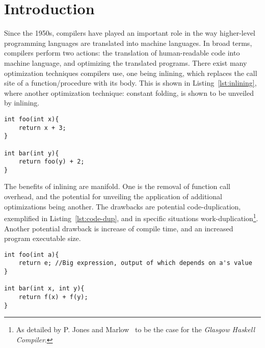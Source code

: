 
\section{Introduction}
\label{introduction}

Since the 1950s, compilers have played an important role in the way higher-level
programming languages are translated into machine languages. In broad terms,
compilers perform two actions: the translation of human-readable code into
machine language, and optimizing the translated programs. There exist many
optimization techniques compilers use, one being inlining, which replaces the
call site of a function/procedure with its body. This is shown in
Listing~\ref{lst:inlining}, where another optimization technique: constant
folding, is shown to be unveiled by inlining.

\begin{lstlisting}[label={lst:inlining}, style=customcpp,
caption={Function \lstinline!foo()! inlined into function \lstinline!bar()!
would result in the body of \lstinline!bar()! being \lstinline!return x + 3 +
2!, in which case constant folding can be used, replacing the \textit{return}
expression of \lstinline!bar()! with: \lstinline!x + 5!.}]
int foo(int x){
	return x + 3;
}

int bar(int y){
	return foo(y) + 2;
}
\end{lstlisting}
\vspace{-4\parskip} %

The benefits of inlining are manifold. One is the removal of function call
overhead, and the potential for unveiling the application of additional
optimizations being another. The drawbacks are potential code-duplication,
exemplified in Listing~\ref{lst:code-dup}, and in specific situations
work-duplication\footnote{As detailed by P. Jones and Marlow~\cite{GHCPaper} to
be the case for the \textit{Glasgow Haskell Compiler}.}. Another potential
drawback is increase of compile time, and an increased program executable size.

\begin{lstlisting}[label={lst:code-dup}, style=customcpp,
caption={Code duplication in \lstinline!bar()!, when inlining \lstinline!foo()!
into \lstinline!bar()!. The big expression \lstinline!e! in \lstinline!foo()!,
would be duplicated when inlined into \lstinline!bar()!. The cost of function
call overhead would be replaced with an increased size of the final program.
However, in this example, the potential for \textit{Common Subexpression
Elimination} (CSE) is likely able to negate some of the program size increase.}]
int foo(int a){
	return e; //Big expression, output of which depends on a's value
}

int bar(int x, int y){
	return f(x) + f(y);
}
\end{lstlisting}
\vspace{-4\parskip} %

